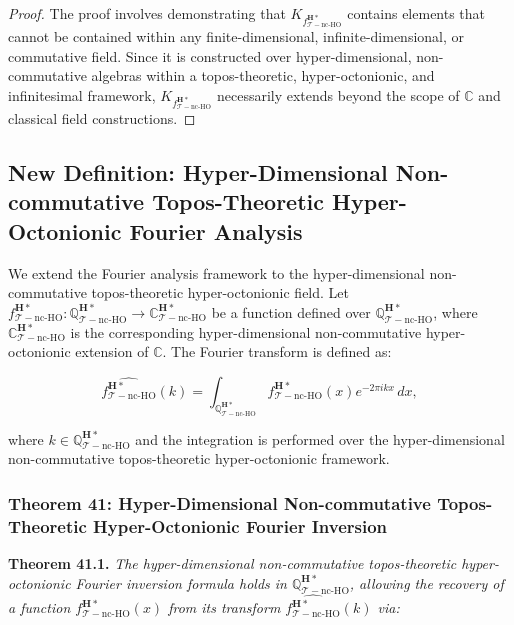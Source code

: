 \documentclass{article}
\begin{document}
\begin{proof}
The proof involves demonstrating that \(K_{f_{\mathcal{T}-\text{nc-HO}}^{\mathbf{H}*}}\) contains elements that cannot be contained within any finite-dimensional, infinite-dimensional, or commutative field. Since it is constructed over hyper-dimensional, non-commutative algebras within a topos-theoretic, hyper-octonionic, and infinitesimal framework, \(K_{f_{\mathcal{T}-\text{nc-HO}}^{\mathbf{H}*}}\) necessarily extends beyond the scope of \(\mathbb{C}\) and classical field constructions.
\end{proof}

\subsection{New Definition: Hyper-Dimensional Non-commutative Topos-Theoretic Hyper-Octonionic Fourier Analysis}
We extend the Fourier analysis framework to the hyper-dimensional non-commutative topos-theoretic hyper-octonionic field. Let \(f_{\mathcal{T}-\text{nc-HO}}^{\mathbf{H}*}: \mathbb{Q}_{\mathcal{T}-\text{nc-HO}}^{\mathbf{H}*} \to \mathbb{C}_{\mathcal{T}-\text{nc-HO}}^{\mathbf{H}*}\) be a function defined over \(\mathbb{Q}_{\mathcal{T}-\text{nc-HO}}^{\mathbf{H}*}\), where \(\mathbb{C}_{\mathcal{T}-\text{nc-HO}}^{\mathbf{H}*}\) is the corresponding hyper-dimensional non-commutative hyper-octonionic extension of \(\mathbb{C}\). The Fourier transform is defined as:

\[
\widehat{f_{\mathcal{T}-\text{nc-HO}}^{\mathbf{H}*}}(k) = \int_{\mathbb{Q}_{\mathcal{T}-\text{nc-HO}}^{\mathbf{H}*}} f_{\mathcal{T}-\text{nc-HO}}^{\mathbf{H}*}(x) e^{-2\pi i k x} \, dx,
\]

where \(k \in \mathbb{Q}_{\mathcal{T}-\text{nc-HO}}^{\mathbf{H}*}\) and the integration is performed over the hyper-dimensional non-commutative topos-theoretic hyper-octonionic framework.

\subsubsection{Theorem 41: Hyper-Dimensional Non-commutative Topos-Theoretic Hyper-Octonionic Fourier Inversion}
\textbf{Theorem 41.1.} \textit{The hyper-dimensional non-commutative topos-theoretic hyper-octonionic Fourier inversion formula holds in \(\mathbb{Q}_{\mathcal{T}-\text{nc-HO}}^{\mathbf{H}*}\), allowing the recovery of a function \(f_{\mathcal{T}-\text{nc-HO}}^{\mathbf{H}*}(x)\) from its transform \(\widehat{f_{\mathcal{T}-\text{nc-HO}}^{\mathbf{H}*}}(k)\) via:}
\end{document}
